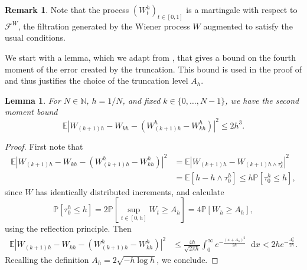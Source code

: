 \documentclass[oneside]{amsart}
\newtheorem{lemma}[theorem]{Lemma}
\theoremstyle{definition}
\newtheorem{remark}[theorem]{Remark}
\newcommand{\N}{\mathbb N}
\newcommand{\D}{\mathop{}\!\mathrm{d}}
\def\P{{\mathbb P}}
\def\E{{\mathbb E}}
\numberwithin{equation}{section}
\begin{document}
\begin{remark}\label{rem:truncated-bm-martingale}
	Note that the process $(W^h_t)_{t \in [0, 1]}$ is a martingale with respect to $\mathcal{F}^W$, the filtration generated by the Wiener process $W$ augmented to satisfy the usual conditions.
\end{remark}

We start with a lemma, which we adapt from \cite[Lemma 2.1]{MiReTr02}, that gives a bound on the fourth moment of the error created by the truncation. This bound is used in the proof of  and thus justifies the choice of the truncation level $A_h$.

\begin{lemma}\label{lem:truncated-BM}
	For $N \in \N$, $h = 1/N$, and fixed $k \in \{0, \dotsc, N-1\}$,  we have the second moment bound
	\begin{equation}
		\E \!\left \lvert W_{{(k+1)h}} - W_{{kh}} - (W^h_{{(k+1)h}} - W^h_{{kh}}) \right \rvert^2 \le 2 h^{3}.
	\end{equation}
\end{lemma}

{\begin{proof}
	First note that
	\begin{equation}
		\begin{split}
			\E \!\left \lvert W_{{(k+1)h}} - W_{{kh}} - (W^h_{{(k+1)h}} - W^h_{{kh}}) \right \rvert^2 & = \E \!\left|W_{(k + 1)h} - W_{(k + 1)h \wedge \tau^h_k}\right|^2\\
			& = \E [h -  h \wedge \tau^h_0] \leq h \P [\tau^h_0 \leq h],
		\end{split}
	\end{equation}
	since $W$ has identically distributed increments, and calculate
	\begin{equation}
		\P[\tau^h_0 \le h] = 2\P\!\left[\sup_{t \in[0, h]}W_t \ge A_h \right] = 4 \P [W_h \geq A_h],
	\end{equation}
	using the reflection principle.
	Then
	\begin{equation}
		\begin{split}
			\E \!\left \lvert W_{{(k+1)h}} - W_{{kh}} - (W^h_{{(k+1)h}} - W^h_{{kh}}) \right \rvert^2 & \leq \frac{4 h}{\sqrt{2 \pi h}}\int_0^\infty e^{- \frac{(x + A_h)^2}{2h}}\D x < 2h e^{-\frac{A_h^2}{2h}}.
		\end{split}
	\end{equation}
	Recalling the definition $A_h = 2 \sqrt{-h \log h}$, we conclude.
\end{proof}
}
\end{document}
